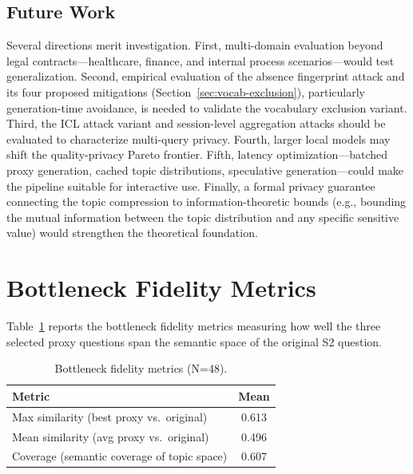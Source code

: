 \documentclass[sigconf,anonymous,review,balance=false]{acmart}
\begin{document}
\subsection{Future Work}
\label{sec:future}

Several directions merit investigation. First, multi-domain evaluation beyond legal contracts---healthcare, finance, and internal process scenarios---would test generalization. Second, empirical evaluation of the absence fingerprint attack and its four proposed mitigations (Section~\ref{sec:vocab-exclusion}), particularly generation-time avoidance, is needed to validate the vocabulary exclusion variant. Third, the ICL attack variant and session-level aggregation attacks should be evaluated to characterize multi-query privacy. Fourth, larger local models may shift the quality-privacy Pareto frontier. Fifth, latency optimization---batched proxy generation, cached topic distributions, speculative generation---could make the pipeline suitable for interactive use. Finally, a formal privacy guarantee connecting the topic compression to information-theoretic bounds (e.g., bounding the mutual information between the topic distribution and any specific sensitive value) would strengthen the theoretical foundation.

\clearpage



\appendix

\section{Bottleneck Fidelity Metrics}
\label{app:fidelity}

Table~\ref{tab:fidelity} reports the bottleneck fidelity metrics measuring how well the three selected proxy questions span the semantic space of the original S2 question.

\begin{table}[h]
\caption{Bottleneck fidelity metrics (N=48).}
\label{tab:fidelity}
\begin{tabular}{lc}
\toprule
\textbf{Metric} & \textbf{Mean} \\
\midrule
Max similarity (best proxy vs.\ original) & 0.613 \\
Mean similarity (avg proxy vs.\ original) & 0.496 \\
Coverage (semantic coverage of topic space) & 0.607 \\
\bottomrule
\end{tabular}
\end{table}
\end{document}
